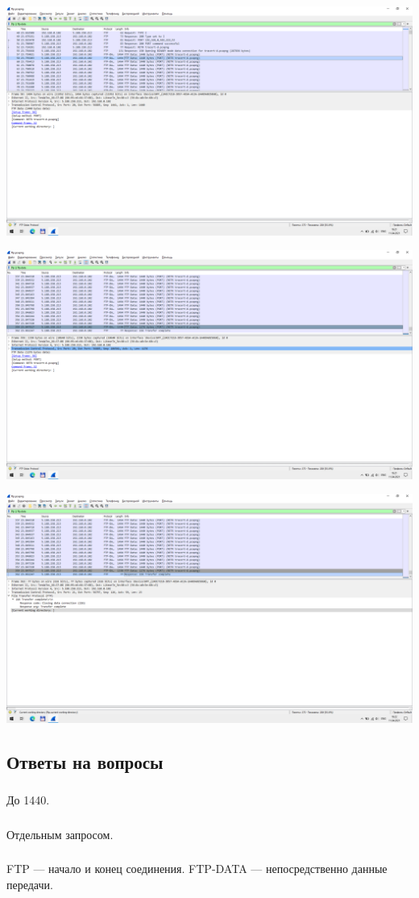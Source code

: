 \begin{center}
    \includegraphics[width=\textwidth]{screenshots/ftp_transfer_2}

    \includegraphics[width=\textwidth]{screenshots/ftp_transfer_3}

    \includegraphics[width=\textwidth]{screenshots/ftp_end_1}

\end{center}

\subsection{Ответы на вопросы}

\subsubsection{}
До 1440.

\subsubsection{}
Отдельным запросом.

\subsubsection{}
FTP --- начало и конец соединения.
FTP-DATA --- непосредственно данные передачи.
